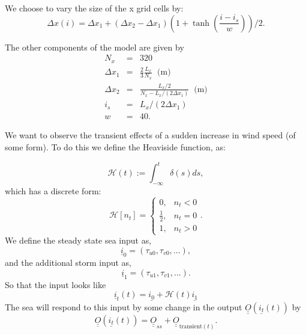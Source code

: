 \documentclass[usenames, dvipsnames, twocolumn]{article}
\begin{document}
We choose to vary the size of the x grid cells by:
\begin{equation}\Delta x(i) = \Delta x_1 + ( \Delta x_2 - \Delta x_1 )
( 1 + \tanh{\left(\frac{i-i_s}{w}\right)} ) /2.\end{equation}

The other components of the model are given by
\begin{eqnarray}
N_x & = & 320 \\
\Delta x_1 & = & \frac{2}{3} \frac{L_x}{N_x} \;\; \mbox{(m)} \\
\Delta x_2 & = & \frac{L_x/2}{N_x-L_x/(2 \Delta x_1)} \;\; \mbox{(m)} \\
i_s & = & L_x/( 2 \Delta x_1 ) \\
w & = & 40.
\end{eqnarray}

We want to observe the transient effects of a sudden increase in wind speed (of some form).
To do this we define the Heaviside function, as:

\begin{equation}
\mathcal{H}(t):=\int_{-\infty}^{t} \delta(s) d s,
\end{equation}
which has a discrete form:
\begin{equation}
\mathcal{H}[n_t]=\left\{\begin{array}{ll}{0,} & {n_t<0} \\ {\frac{1}{2},} & {n_t=0} \\ {1,} & {n_t>0}\end{array}\right. .
\end{equation}
We define the steady state sea input as,
\begin{equation}
    \underline{i}_0 = (\tau_{u0}, \tau_{v0}, ...) ,
\end{equation}
and the additional storm input as,
\begin{equation}
    \underline{i}_1 = (\tau_{u1}, \tau_{v1}, ...) .
\end{equation}
So that the input looks like
\begin{equation}
    \underline{i}_t(t) = \underline{i_0} + \mathcal{H}(t)\underline{i_1}
\end{equation}
The sea will respond to this input by some change in the output
\( \underline{\underline{O}}(\underline{i_t}(t))\) by
\begin{equation}
    \underline{\underline{O}}(\underline{i_t}(t))= \underline{\underline{O}}_{ss} + \underline{\underline{O}}_{\mathrm{transient}(t)}.
\end{equation}
\end{document}
